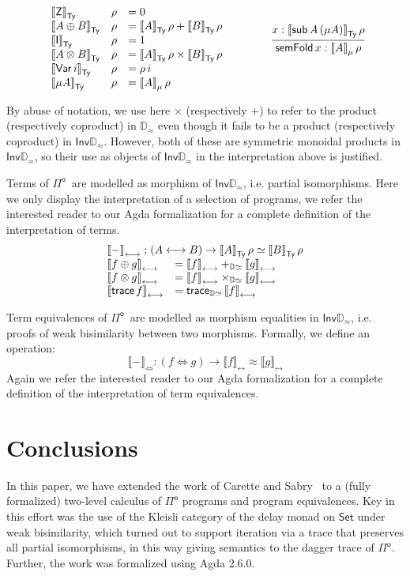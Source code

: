 \documentclass[runningheads,a4paper]{llncs}
\newcommand{\Pio}{\ensuremath{\mathsf{\Pi}^{\mathsf{o}}}}
\newcommand{\Set}{\mathsf{Set}}
\newcommand{\Inv}{\mathsf{Inv}}
\newcommand{\Var}{\mathsf{Var}}
\newcommand{\lr}{\longleftrightarrow}
\newcommand{\sub}{\mathsf{sub}}
\newcommand{\trace}{\ensuremath{\mathsf{trace}}}
\newcommand{\Z}{\mathsf{Z}}
\newcommand{\I}{\mathsf{I}}
\newcommand{\LR}{\iff}
\newcommand{\D}{\mathbb{D}}
\newcommand{\Dapprox}{\mathbb{D}_{\approx}}
\newcommand{\semTy}[1]{{\llbracket #1 \rrbracket}_\mathsf{Ty}}
\newcommand{\semMu}[1]{{\llbracket #1 \rrbracket}_\mu}
\newcommand{\semTm}[1]{{\llbracket #1 \rrbracket}_{\lr}}
\newcommand{\semEq}[1]{{\llbracket #1 \rrbracket}_{\!\!\LR}}
\newcommand{\semTrace}{\mathsf{trace}_{\D\simeq}}
\begin{document}
\[
\begin{array}{lll}
\semTy \Z & \rho & = 0 \\
\semTy {A \oplus B} & \rho & = \semTy A \,\rho+ \semTy B  \, \rho\\
\semTy \I & \rho & = 1 \\
\semTy {A \otimes B} & \rho & = \semTy A \,\rho \times \semTy B \,\rho\\
\semTy {\Var\,i} & \rho & = \rho\, i \\
\semTy {\mu A} & \rho & = \semMu A \,\rho
\end{array}
\qquad \qquad
\infer{\mathsf{semFold} \,x : \semMu {A}\,\rho}{x : \semTy
  {\sub\,A\,(\mu A)} \, \rho}
\]

By abuse of notation, we use here $\times$ (respectively $+$) to refer
to the product (respectively coproduct) in $\Dapprox$ even though it
fails to be a product (respectively coproduct) in $\Inv\Dapprox$.
However, both of these are symmetric monoidal products in
$\Inv\Dapprox$, so their use as objects of $\Inv\Dapprox$ in the
interpretation above is justified.

Terms of \Pio\ are modelled as morphism of $\Inv\Dapprox$,
i.e. partial isomorphisms. Here we only display the interpretation of a
selection of programs, we refer the interested reader to our Agda formalization for a
complete definition of the interpretation of terms.
\[
\begin{array}{ll}
\multicolumn{2}{l}{\semTm - : (A \lr B) \to \semTy A \, \rho \simeq
  \semTy B \, \rho}  \\
\semTm {f \oplus g} & = \semTm f +_{\D\simeq} \semTm g \\
\semTm {f \otimes g} & = \semTm f \times_{\D\simeq} \semTm g \\
\semTm {\trace\,f} & = \semTrace\,\semTm f
\end{array}
\]

Term equivalences of \Pio\ are modelled as morphism equalities in
$\Inv\Dapprox$, i.e. proofs of weak bisimilarity between two
morphisms. Formally, we define an operation:
\[
\semEq - : (f \LR g) \to \semTm f \approx \semTm g
\]
Again we refer the interested reader to our Agda formalization for a
complete definition of the interpretation of term equivalences.


\section{Conclusions}\label{sec:conclusions}
In this paper, we have extended the work of Carette and Sabry~\cite{CaretteS16}
to a (fully formalized) two-level calculus of \Pio{} programs and program
equivalences. Key in this effort was the use of the Kleisli category of the
delay monad on $\Set$ under weak bisimilarity, which turned out to support
iteration via a trace that preserves all partial isomorphisms, in this way
giving semantics to the dagger trace of \Pio. Further, the work was formalized
using Agda 2.6.0.
\end{document}
